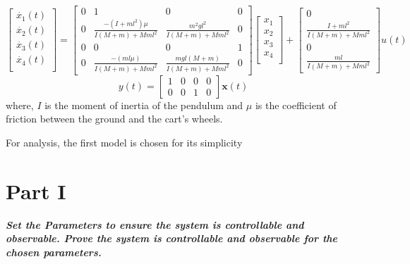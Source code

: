 \documentclass[11pt]{article}
\begin{document}
\[
\begin{bmatrix}
    \dot{x_1}(t)\\
    \dot{x_2}(t)\\
    \dot{x_3}(t)\\
    \dot{x_4}(t)\\
\end{bmatrix} = \begin{bmatrix}
    0 & 1 & 0 & 0 \\
    0 & \frac{-(I+ml^2)\mu}{I(M+m)+Mml^2} & \frac{m^2gl^2}{I(M+m)+Mml^2} &  0\\
    0 &      0      &        0    &       1\\
    0 &  \frac{-(ml\mu)}{I(M+m)+Mml^2}  &     \frac{mgl(M+m)}{I(M+m)+Mml^2} &  0 
\end{bmatrix}\begin{bmatrix}
    x_1 \\
    x_2 \\
    x_3 \\
    x_4 \\
    \end{bmatrix}+ \begin{bmatrix}
    0 \\ \frac{I+ml^2}{I(M+m)+Mml^2} \\ 0 \\ \frac{ml}{I(M+m)+Mml^2}
\end{bmatrix} u(t) \]\[
    y(t) = \begin{bmatrix}
    1 & 0 & 0 & 0\\
    0 & 0 & 1 & 0
    \end{bmatrix}\mathbf{x}(t)
\] where, \(I\) is the moment of inertia of the pendulum and \(\mu\) is
the coefficient of friction between the ground and the cart's wheels.

For analysis, the first model is chosen for its simplicity

\section{Part I}\label{part-i}

\textbf{\emph{Set the Parameters to ensure the system is controllable
and observable. Prove the system is controllable and observable for the
chosen parameters.}}
\end{document}

